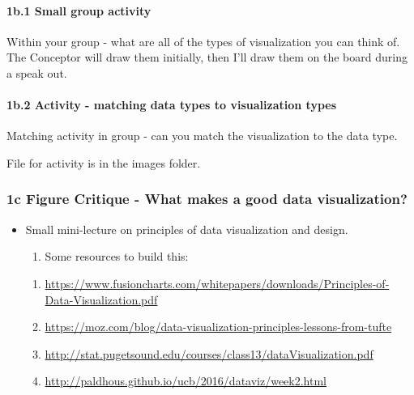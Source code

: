 \documentclass[]{article}
\providecommand{\tightlist}{%
  \setlength{\itemsep}{0pt}\setlength{\parskip}{0pt}}
\let\oldparagraph\paragraph
\renewcommand{\paragraph}[1]{\oldparagraph{#1}\mbox{}}
\begin{document}
\hypertarget{b.1-small-group-activity}{%
\paragraph{1b.1 Small group activity}\label{b.1-small-group-activity}}

Within your group - what are all of the types of visualization you can
think of. The Conceptor will draw them initially, then I'll draw them on
the board during a speak out.

\hypertarget{b.2-activity---matching-data-types-to-visualization-types}{%
\paragraph{1b.2 Activity - matching data types to visualization
types}\label{b.2-activity---matching-data-types-to-visualization-types}}

Matching activity in group - can you match the visualization to the data
type.

File for activity is in the images folder.

\hypertarget{c-figure-critique---what-makes-a-good-data-visualization}{%
\subsubsection{1c Figure Critique - What makes a good data
visualization?}\label{c-figure-critique---what-makes-a-good-data-visualization}}

\begin{itemize}
\tightlist
\item
  Small mini-lecture on principles of data visualization and design.

  \begin{enumerate}
  \def\labelenumi{\arabic{enumi}.}
  \tightlist
  \item
    Some resources to build this:
  \end{enumerate}

  \begin{enumerate}
  \def\labelenumi{\alph{enumi}.}
  \tightlist
  \item
    \url{https://www.fusioncharts.com/whitepapers/downloads/Principles-of-Data-Visualization.pdf}
  \item
    \url{https://moz.com/blog/data-visualization-principles-lessons-from-tufte}
  \item
    \url{http://stat.pugetsound.edu/courses/class13/dataVisualization.pdf}
  \item
    \url{http://paldhous.github.io/ucb/2016/dataviz/week2.html}
  \end{enumerate}
\end{itemize}
\end{document}

